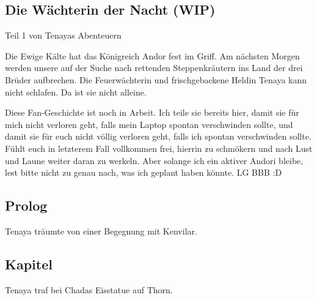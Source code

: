 \begin{chapterbox}
    \chapter{Die Wächterin der Nacht (WIP)}
    \label{wip-die-waechterin-der-nacht}
    
    \begin{center}
        Teil 1 von Tenayas Abenteuern
    \end{center}

    Die Ewige Kälte hat das Königreich Andor fest im Griff. Am nächsten Morgen werden unsere  auf der Suche nach rettenden Steppenkräutern ins Land der drei Brüder aufbrechen. Die Feuerwächterin und frischgebackene Heldin Tenaya kann nicht schlafen. Da ist sie nicht alleine.
\end{chapterbox}



Diese Fan-Geschichte ist noch in Arbeit. Ich teile sie bereits hier, damit sie für mich nicht verloren geht, falls mein Laptop spontan verschwinden sollte, und damit sie für euch nicht völlig verloren geht, falls ich spontan verschwinden sollte. Fühlt euch in letzterem Fall vollkommen frei, hierrin zu schmökern und nach Lust und Laune weiter daran zu werkeln. Aber solange ich ein aktiver Andori bleibe, lest bitte nicht zu genau nach, was ich geplant haben könnte. LG BBB :D



\newpage
\section{Prolog}


Tenaya träumte von einer Begegnung mit Kenvilar.






\newpage
\section{Kapitel}



Tenaya traf bei Chadas Eisstatue auf Thorn.